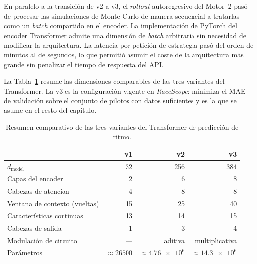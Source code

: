 En paralelo a la transición de v2 a v3, el \textit{rollout} autoregresivo del Motor~2 pasó de procesar las simulaciones de Monte Carlo de manera secuencial a tratarlas como un \textit{batch} compartido en el encoder. La implementación de PyTorch del encoder Transformer admite una dimensión de \textit{batch} arbitraria sin necesidad de modificar la arquitectura. La latencia por petición de estrategia pasó del orden de minutos al de segundos, lo que permitió asumir el coste de la arquitectura más grande sin penalizar el tiempo de respuesta del API.

La Tabla~\ref{tab:evolucion_transformer} resume las dimensiones comparables de las tres variantes del Transformer. La v3 es la configuración vigente en \textit{RaceScope}: minimiza el MAE de validación sobre el conjunto de pilotos con datos suficientes y es la que se asume en el resto del capítulo.

\begin{table}[htbp]
\centering
\caption{Resumen comparativo de las tres variantes del Transformer de predicción de ritmo.}
\label{tab:evolucion_transformer}
\small
\begin{tabular*}{\textwidth}{@{\extracolsep{\fill}}lrrr}
\toprule
 & \textbf{v1} & \textbf{v2} & \textbf{v3} \\
\midrule
$d_\text{model}$                            & 32                       & 256                       & 384 \\
Capas del encoder                           & 2                        & 6                         & 8 \\
Cabezas de atención                         & 4                        & 8                         & 8 \\
Ventana de contexto (vueltas)               & 15                       & 25                        & 40 \\
Características continuas                   & 13                       & 14                        & 15 \\
Cabezas de salida                           & 1                        & 3                         & 4 \\
Modulación de circuito                      & ---                      & aditiva                   & multiplicativa \\
Parámetros                                  & $\approx \num{26500}$    & $\approx \num{4.76e6}$    & $\approx \num{14.3e6}$ \\
\bottomrule
\end{tabular*}
\end{table}

